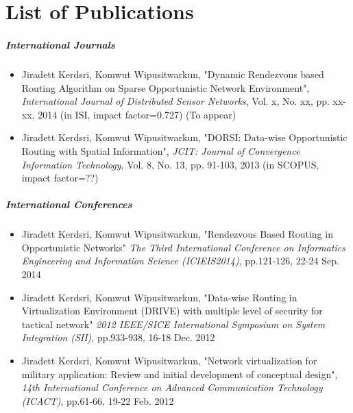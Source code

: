 \chapter{List of Publications}
\label{app1}


\paragraph{International Journals}

\begin{itemize}
\item Jiradett Kerdsri, Komwut Wipusitwarkun, "Dynamic Rendezvous based Routing Algorithm on Sparse Opportunistic Network Environment", \textit{International Journal of Distributed Sensor Networks}, Vol. x, No. xx, pp. xx-xx, 2014 (in ISI, impact factor=0.727)
(To appear)
  \item Jiradett Kerdsri, Komwut Wipusitwarkun, "DORSI: Data-wise Opportunistic Routing with Spatial Information", \textit{JCIT: Journal of Convergence Information Technology}, Vol. 8, No. 13, pp. 91-103, 2013 (in SCOPUS, impact factor=??)
\end{itemize}


\paragraph{International Conferences}

\begin{itemize}
\item Jiradett Kerdsri, Komwut Wipusitwarkun, "Rendezvous Based Routing in Opportunistic Networks" \textit{The Third International Conference on Informatics Engineering and Information Science (ICIEIS2014)}, pp.121-126, 22-24 Sep. 2014
\item Jiradett Kerdsri, Komwut Wipusitwarkun, "Data-wise Routing in Virtualization Environment (DRIVE) with multiple level of security for tactical network" \textit{2012 IEEE/SICE International Symposium on System Integration (SII)}, pp.933-938, 16-18 Dec. 2012
\item Jiradett Kerdsri, Komwut Wipusitwarkun, "Network virtualization for military application: Review and initial development of conceptual design", \textit{14th International Conference on Advanced Communication Technology (ICACT)}, pp.61-66, 19-22 Feb. 2012  
\end{itemize}